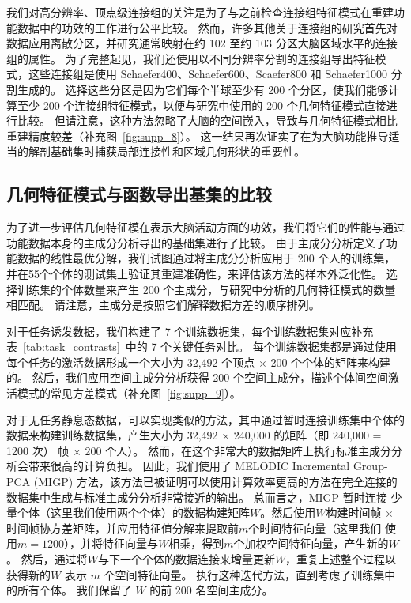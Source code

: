 \documentclass[lang=cn,a4paper,newtx,citestyle=gb7714-2015, bibstyle=gb7714-2015]{elegantpaper}
\begin{document}
我们对高分辨率、顶点级连接组的关注是为了与之前检查连接组特征模式在重建功能数据中的功效的工作进行公平比较\cite{mitra2015lag,felleman1991distributed}。
然而，许多其他关于连接组的研究首先对数据应用离散分区，并研究通常映射在约 102 至约 103 分区大脑区域水平的连接组的属性\cite{chaudhuri2015large,goodale1992separate}。
为了完整起见，我们还使用以不同分辨率分割的连接组导出特征模式，这些连接组是使用 Schaefer400、Schaefer600、Scaefer800 和 Schaefer1000 分割生成的。
选择这些分区是因为它们每个半球至少有 200 个分区，使我们能够计算至少 200 个连接组特征模式，以便与研究中使用的 200 个几何特征模式直接进行比较。
但请注意，这种方法忽略了大脑的空间嵌入，导致与几何特征模式相比重建精度较差（补充图~\ref{fig:supp_8}）。
这一结果再次证实了在为大脑功能推导适当的解剖基础集时捕获局部连接性和区域几何形状的重要性。




\subsection{几何特征模式与函数导出基集的比较} \label{sec:comparison_eigenmodes_derived}

为了进一步评估几何特征模在表示大脑活动方面的功效，我们将它们的性能与通过功能数据本身的主成分分析导出的基础集进行了比较。
由于主成分分析定义了功能数据的线性最优分解，我们试图通过将主成分分析应用于 200 个人的训练集，并在55个个体的测试集上验证其重建准确性，来评估该方法的样本外泛化性。
选择训练集的个体数量来产生 200 个主成分，与研究中分析的几何特征模式的数量相匹配。
请注意，主成分是按照它们解释数据方差的顺序排列。


对于任务诱发数据，我们构建了 7 个训练数据集，每个训练数据集对应补充表~\ref{tab:task_contrasts}~中的 7 个关键任务对比。
每个训练数据集都是通过使用每个任务的激活数据形成一个大小为 32,492 个顶点 $ \times $ 200 个个体的矩阵来构建的。
然后，我们应用空间主成分分析获得 200 个空间主成分，描述个体间空间激活模式的常见方差模式（补充图~\ref{fig:supp_9}）。


对于无任务静息态数据，可以实现类似的方法，其中通过暂时连接训练集中个体的数据来构建训练数据集，产生大小为 32,492 $ \times $ 240,000 的矩阵（即 240,000 = 1200 次） 帧 $ \times $ 200 个人）。
然而，在这个非常大的数据矩阵上执行标准主成分分析会带来很高的计算负担。
因此，我们使用了 MELODIC Incremental Group-PCA (MIGP) 方法，该方法已被证明可以使用计算效率更高的方法\cite{markov2014anatomy}在完全连接的数据集中生成与标准主成分分析非常接近的输出。
总而言之，MIGP 暂时连接 少量个体（这里我们使用两个个体）的数据构建矩阵$ W $。然后使用$ W $构建时间帧 $ \times $ 时间帧协方差矩阵，并应用特征值分解来提取前$ m $个时间特征向量（这里我们 使用$ m = 1200 $），并将特征向量与$ W $相乘，得到$ m $个加权空间特征向量，产生新的$ W $。
然后，通过将$ W $与下一个个体的数据连接来增量更新$ W $，重复上述整个过程以获得新的$ W $ 表示 $ m $ 个空间特征向量。
执行这种迭代方法，直到考虑了训练集中的所有个体。
我们保留了 $ W $ 的前 200 名空间主成分。
\end{document}
